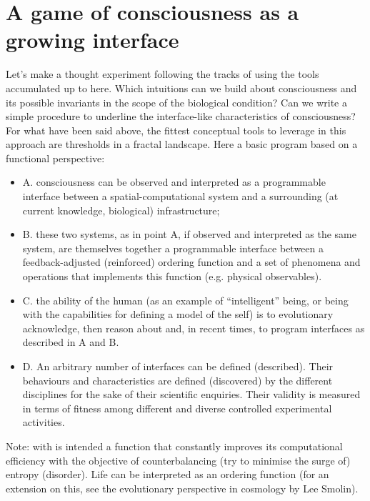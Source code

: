 \documentclass[14pt]{extarticle}
\begin{document}
\section*{A game of consciousness as a growing interface}
\label{sec:consciousness}


\hspace*{15mm}Let’s make a thought experiment following the tracks of \cite{hofstadter1981mind,hofstadter2000godel} using the tools accumulated up to here. Which intuitions can we build about consciousness and its possible invariants in the scope of the biological condition? Can we write a simple procedure to underline the interface-like characteristics of consciousness? For what have been said above, the fittest conceptual tools to leverage in this approach are thresholds in a fractal landscape. Here a basic program based on a functional perspective: 
\begin{itemize}
\item A. consciousness can be observed  and interpreted as a programmable interface between a spatial-computational system and a surrounding (at current knowledge, biological) infrastructure;
\item B. these two systems, as in point A, if observed and interpreted as the same system, are themselves together a programmable interface between a feedback-adjusted (reinforced) ordering function and a set of phenomena and operations that implements this function (e.g. physical observables).
\item C. the ability of the human (as an example of “intelligent” being, or being with the capabilities for defining a model of the self) is to evolutionary acknowledge, then reason about and, in recent times, to program interfaces as described in A and B.
\item D. An arbitrary number of interfaces can be defined (described). Their behaviours and characteristics are defined (discovered) by the different disciplines for the sake of their scientific enquiries. Their validity is measured in terms of fitness among different and diverse controlled experimental activities.
\end{itemize}
Note: with  is intended a function that constantly improves its computational efficiency with the objective of counterbalancing (try to minimise the surge of) entropy (disorder). Life can be interpreted as an ordering function (for an extension on this, see the evolutionary perspective in cosmology by Lee Smolin).
\newline
\end{document}
